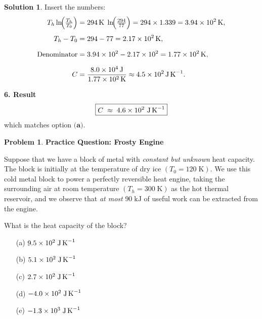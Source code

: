\documentclass[12pt]{article}
\theoremstyle{definition} %
\newtheorem{solution}{Solution}
\newtheorem{problem}{Problem}
\theoremstyle{plain} %
\begin{document}
\begin{solution}
              Insert the numbers:
              \[
              \begin{aligned}
              T_h\ln\!\Bigl(\tfrac{T_h}{T_0}\Bigr) &=
                294\,\text{K}\;\ln\!\Bigl(\tfrac{294}{77}\Bigr)
                = 294\times1.339 = 3.94\times10^{2}\,\text{K},\\[4pt]
              T_h-T_0 &= 294-77 = 2.17\times10^{2}\,\text{K},\\[6pt]
              \text{Denominator} &= 3.94\times10^{2}-2.17\times10^{2}
                                 = 1.77\times10^{2}\,\text{K},\\[6pt]
              C &= \frac{8.0\times10^{4}\,\text{J}}{1.77\times10^{2}\,\text{K}}
                 \approx 4.5\times10^{2}\,\text{J\,K}^{-1}.
              \end{aligned}
              \]
              
              \textbf{6. Result}\\
              \[
              \boxed{C \;\approx\; 4.6\times10^{2}\ \text{J\,K}^{-1}}
              \]
              which matches option \(\textbf{(a)}\).
              \end{solution}
              \pagebreak
              \begin{problem}
                \textbf{Practice Question: Frosty Engine}
                
                Suppose that we have a block of metal with \emph{constant but unknown} heat capacity.  
                The block is initially at the temperature of dry ice \((T_0 = 120\;\text{K})\).  
                We use this cold metal block to power a perfectly reversible heat engine, taking the surrounding
                air at room temperature \((T_h = 300\;\text{K})\) as the hot thermal reservoir, and we observe
                that \emph{at most} \(90\;\text{kJ}\) of useful work can be extracted from the engine.
                
                \medskip
                What is the heat capacity of the block?
                
                \begin{enumerate}
                  \item[(a)] \(9.5 \times 10^{2}\;\text{J\,K}^{-1}\)
                  \item[(b)] \(5.1 \times 10^{2}\;\text{J\,K}^{-1}\)
                  \item[(c)] \(2.7 \times 10^{2}\;\text{J\,K}^{-1}\)
                  \item[(d)] \(-4.0 \times 10^{2}\;\text{J\,K}^{-1}\)
                  \item[(e)] \(-1.3 \times 10^{3}\;\text{J\,K}^{-1}\)
                \end{enumerate}
              \end{problem}
\end{document}
